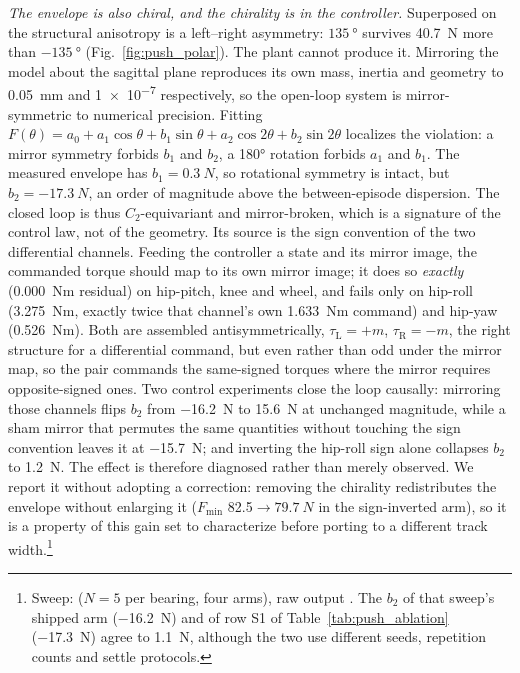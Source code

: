 \documentclass[conference]{IEEEtran}
\begin{document}
\emph{The envelope is also chiral, and the chirality is in the controller.}
Superposed on the structural anisotropy is a left--right asymmetry:
$\SI{135}{\degree}$ survives \SI{40.7}{N} more than $-\SI{135}{\degree}$
(Fig.~\ref{fig:push_polar}). The plant cannot produce it. Mirroring the model
about the sagittal plane reproduces its own mass, inertia and geometry to
\SI{0.05}{mm} and \num{1e-7} respectively, so the open-loop system is
mirror-symmetric to numerical precision. Fitting
$F(\theta){=}a_0{+}a_1\cos\theta{+}b_1\sin\theta{+}a_2\cos2\theta{+}b_2\sin2\theta$
localizes the violation: a mirror symmetry forbids $b_1$ and $b_2$, a
\ang{180} rotation forbids $a_1$ and $b_1$. The measured envelope has
$b_1{=}\SI{0.3}{N}$, so rotational symmetry is intact, but $b_2{=}\SI{-17.3}{N}$, an order of magnitude above the between-episode
dispersion. The closed loop is thus $C_2$-equivariant and mirror-broken, which
is a signature of the control law, not of the geometry.
Its source is the sign convention of the two differential channels. Feeding the
controller a state and its mirror image, the commanded torque should map to its
own mirror image; it does so \emph{exactly} (\SI{0.000}{Nm} residual) on
hip-pitch, knee and wheel, and fails only on hip-roll (\SI{3.275}{Nm}, exactly
twice that channel's own \SI{1.633}{Nm} command) and hip-yaw (\SI{0.526}{Nm}).
Both are assembled antisymmetrically, $\tau_{\text{L}}{=}{+}m$,
$\tau_{\text{R}}{=}{-}m$, the right structure for a differential command, but
even rather than odd under the mirror map, so the pair commands the
same-signed torques where the mirror requires opposite-signed ones. Two
control experiments close the loop causally: mirroring those channels flips
$b_2$ from \SI{-16.2}{N} to \SI{+15.6}{N} at unchanged magnitude, while a sham
mirror that permutes the same quantities without touching the sign convention
leaves it at \SI{-15.7}{N}; and inverting the hip-roll sign alone collapses
$b_2$ to \SI{+1.2}{N}. The effect is therefore diagnosed rather than
merely observed. We report it without adopting a correction: removing the
chirality redistributes the envelope without enlarging it
($F_{\min}$ \SI{82.5}{}${\rightarrow}\SI{79.7}{N}$ in the sign-inverted arm),
so it is a property of this gain set to characterize before porting to a
different track width.\footnote{Sweep:
 ($N{=}5$ per bearing, four arms), raw
output . The $b_2$ of that sweep's shipped arm
(\SI{-16.2}{N}) and of row S1 of Table~\ref{tab:push_ablation}
(\SI{-17.3}{N}) agree to \SI{1.1}{N}, although the two use different seeds,
repetition counts and settle protocols.}
\end{document}
